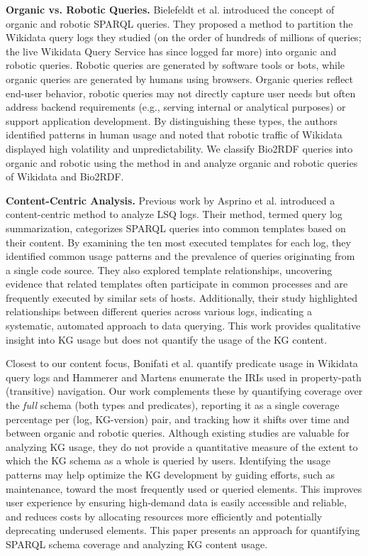 \documentclass[sw]{iosart2x}
\begin{document}
\textbf{Organic vs. Robotic Queries.} Bielefeldt et al. \cite{bielefeldt2018practical,malyshev2018getting} introduced the concept of organic and robotic SPARQL queries. They proposed a method to partition the Wikidata query logs they studied (on the order of hundreds of millions of queries; the live Wikidata Query Service has since logged far more) into organic and robotic queries. Robotic queries are generated by software tools or bots, while organic queries are generated by humans using browsers. Organic queries reflect end-user behavior, robotic queries may not directly capture user needs but often address backend requirements (e.g., serving internal or analytical purposes) or support application development. By distinguishing these types, the authors identified patterns in human usage and noted that robotic traffic of Wikidata displayed high volatility and unpredictability. We classify Bio2RDF queries into organic and robotic using the method in \cite{malyshev2018getting} and analyze organic and robotic queries of Wikidata and Bio2RDF.

\textbf{Content-Centric Analysis.} Previous work by Asprino et al. \cite{asprino2023your} introduced a content-centric method to analyze LSQ logs. Their method, termed query log summarization, categorizes SPARQL queries into common templates based on their content. By examining the ten most executed templates for each log, they identified common usage patterns and the prevalence of queries originating from a single code source. They also explored template relationships, uncovering evidence that related templates often participate in common processes and are frequently executed by similar sets of hosts. Additionally, their study highlighted relationships between different queries across various logs, indicating a systematic, automated approach to data querying. This work provides qualitative insight into KG  usage but does not quantify the usage of the KG content.

Closest to our content focus, Bonifati et al. \cite{bonifati2019navigating} quantify predicate usage in Wikidata query logs and Hammerer and Martens \cite{hammerer2025compendium} enumerate the IRIs used in property-path (transitive) navigation. Our work complements these by quantifying coverage over the \emph{full} schema (both types and predicates), reporting it as a single coverage percentage per (log, KG-version) pair, and tracking how it shifts over time and between organic and robotic queries. Although existing studies are valuable for analyzing KG usage, they do not provide a quantitative measure of the extent to which the KG schema as a whole is queried by users. Identifying the usage patterns may help optimize the KG development by guiding efforts, such as maintenance, toward the most frequently used or queried elements. This improves user experience by ensuring high-demand data is easily accessible and reliable, and reduces costs by allocating resources more efficiently and potentially deprecating underused elements. This paper presents an approach for quantifying SPARQL schema coverage and analyzing KG content usage.
\end{document}
